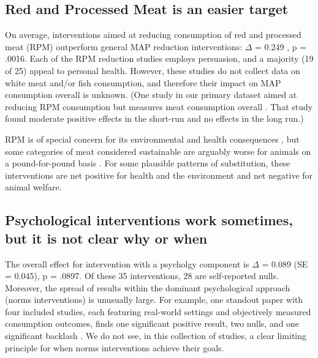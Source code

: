 \documentclass[sn-nature,referee,pdflatex]{sn-jnl}
\begin{document}
\subsection{Red and Processed Meat is an easier target}\label{sec2.3}

On average, interventions aimed at reducing consumption of red and
processed meat (RPM) outperform general MAP reduction interventions:
\(\Delta\) = 0.249 , p = .0016. Each of the RPM
reduction studies employs persuasion, and a majority (19 of 25) appeal
to personal health. However, these studies do not collect data on white
meat and/or fish consumption, and therefore their impact on MAP
consumption overall is unknown. (One study in our primary dataset aimed
at reducing RPM consumption but measures meat consumption overall
\citep{shreedhar2021}. That study found moderate positive effects in the
short-run and no effects in the long run.)

RPM is of special concern for its environmental and health consequences
\citep{grummon2023}, but some categories of meat considered sustainable
are arguably worse for animals on a pound-for-pound basis
\citep{mathur2022ethical}. For some plausible patterns of substitution,
these interventions are net positive for health and the environment and
net negative for animal welfare.

\subsection{Psychological interventions work sometimes, but it is not
clear why or when}\label{sec2.4}

The overall effect for intervention with a psycholgy component is
\(\Delta\) = 0.089 (SE = 0.045), p = .0897. Of these 35 interventions,
28 are self-reported nulls. Moreover, the spread of results within the
dominant psychological approach (norms interventions) is unusually
large. For example, one standout paper with four included studies, each
featuring real-world settings and objectively measured consumption
outcomes, finds one significant positive result, two nulls, and one
significant backlash \citep{sparkman2020}. We do not see, in this
collection of studies, a clear limiting principle for when norms
interventions achieve their goals.

\begin{comment} say something about dannenberg 2024 or the 2024 meta-analysis that finds vey little?
\end{comment}
\end{document}

